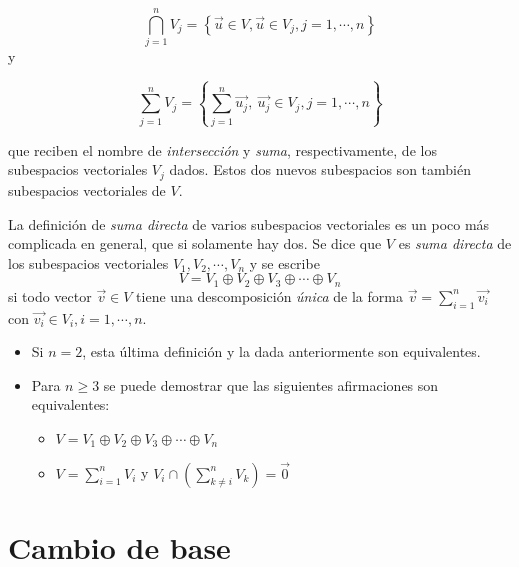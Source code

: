 $$\bigcap^{n}_{j=1}V_j=\left\{\vec{u}\in V, \vec{u}\in V_j, j=1,\cdots,n\right\}$$
\noindent
y

$$\sum^{n}_{j=1}V_j=\left\{\sum^{n}_{j=1}\vec{u_j},~ \vec{u_j}\in V_j,j=1,\cdots,n\right\}$$

\bigskip
\noindent
que reciben el nombre de \textit{intersección} y \textit{suma}, respectivamente, de los subespacios vectoriales $V_j$ dados. Estos dos nuevos subespacios son también subespacios vectoriales de $V$.



La definición de \textsl{suma directa} de varios subespacios vectoriales es un poco más complicada en general, que si solamente hay dos. Se dice  que $V$ es \textsl{suma directa}  de los subespacios vectoriales  $V_1, V_2, \cdots, V_n$ y se escribe
$$ V= V_1 \oplus V_2 \oplus V_3 \oplus \cdots \oplus V_n$$
si todo vector  $\vec{v}\in V$  tiene  una descomposición \textsl{ única} de la forma $\vec{v}=\sum^{n}_{i=1} \vec{v_i}$ con $\vec{v_i} \in V_i, i=1,\cdots, n $.  



\begin{remark}
\label{obssumadesub}
\begin{itemize}

\item
Si $n=2$, esta última definición y la dada anteriormente son equivalentes. 

\item
Para $n\geq 3$ se puede demostrar que las siguientes afirmaciones son  equivalentes:

\begin{itemize}
\item
$ V= V_1 \oplus V_2 \oplus V_3 \oplus \cdots \oplus V_n$

\item

$V= \sum^{n}_{i=1}V_i$ y $V_i\cap(\sum^{n}_{k \neq i}V_k)={\vec{0}}$

\end{itemize}

\end{itemize}
\end{remark}




\section{ Cambio de base}
\label{Cambio de base}

